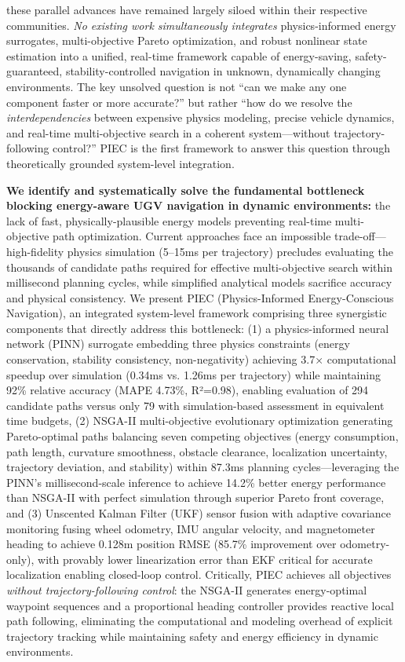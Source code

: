 \documentclass[pdflatex,sn-nature]{sn-jnl}%
\begin{document}
these parallel advances have remained largely siloed within their respective communities. \emph{No existing work simultaneously integrates} physics-informed energy surrogates, multi-objective Pareto optimization, and robust nonlinear state estimation into a unified, real-time framework capable of energy-saving, safety-guaranteed, stability-controlled navigation in unknown, dynamically changing environments. The key unsolved question is not ``can we make any one component faster or more accurate?'' but rather ``how do we resolve the \emph{interdependencies} between expensive physics modeling, precise vehicle dynamics, and real-time multi-objective search in a coherent system—without trajectory-following control?'' PIEC is the first framework to answer this question through theoretically grounded system-level integration.

\textbf{We identify and systematically solve the fundamental bottleneck blocking energy-aware UGV navigation in dynamic environments:} the lack of fast, physically-plausible energy models preventing real-time multi-objective path optimization. Current approaches face an impossible trade-off—high-fidelity physics simulation (5--15ms per trajectory) precludes evaluating the thousands of candidate paths required for effective multi-objective search within millisecond planning cycles, while simplified analytical models sacrifice accuracy and physical consistency. We present PIEC (Physics-Informed Energy-Conscious Navigation), an integrated system-level framework comprising three synergistic components that directly address this bottleneck: (1) a physics-informed neural network (PINN) surrogate embedding three physics constraints (energy conservation, stability consistency, non-negativity) achieving 3.7× computational speedup over simulation (0.34ms vs. 1.26ms per trajectory) while maintaining 92\% relative accuracy (MAPE 4.73\%, R²=0.98), enabling evaluation of 294 candidate paths versus only 79 with simulation-based assessment in equivalent time budgets, (2) NSGA-II multi-objective evolutionary optimization generating Pareto-optimal paths balancing seven competing objectives (energy consumption, path length, curvature smoothness, obstacle clearance, localization uncertainty, trajectory deviation, and stability) within 87.3ms planning cycles—leveraging the PINN's millisecond-scale inference to achieve 14.2\% better energy performance than NSGA-II with perfect simulation through superior Pareto front coverage, and (3) Unscented Kalman Filter (UKF) sensor fusion with adaptive covariance monitoring fusing wheel odometry, IMU angular velocity, and magnetometer heading to achieve 0.128m position RMSE (85.7\% improvement over odometry-only), with provably lower linearization error than EKF critical for accurate localization enabling closed-loop control. Critically, PIEC achieves all objectives \emph{without trajectory-following control}: the NSGA-II generates energy-optimal waypoint sequences and a proportional heading controller provides reactive local path following, eliminating the computational and modeling overhead of explicit trajectory tracking while maintaining safety and energy efficiency in dynamic environments.
\end{document}
